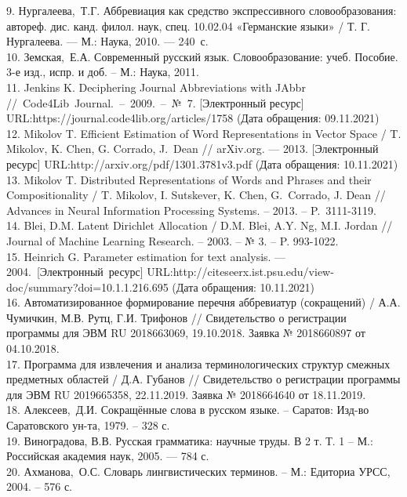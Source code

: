 \documentclass[a4paper, 12pt]{article}
\begin{document}
9. Нургалеева, Т.Г. Аббревиация как средство экспрессивного словообразования: автореф. дис. канд. филол. наук, спец. 10.02.04 «Германские языки» / Т. Г. Нургалеева. — М.: Наука, 2010. — 240 с.\\
10. Земская, Е.А. Современный русский язык. Словообразование: учеб. Пособие. 3-е изд., испр. и доб. – М.: Наука, 2011.\\
11. Jenkins K. Deciphering Journal Abbreviations with JAbbr // Code4Lib Journal. – 2009. – № 7. [Электронный ресурс] URL:https://journal.code4lib.org/articles/1758 (Дата обращения: 09.11.2021)\\
12. Mikolov T. Efficient Estimation of Word Representations in Vector Space / T. Mikolov, K. Chen, G. Corrado, J. Dean // arXiv.org. — 2013. [Электронный ресурс] URL:http://arxiv.org/pdf/1301.3781v3.pdf (Дата обращения: 10.11.2021)\\
13. Mikolov T. Distributed Representations of Words and Phrases and their Compositionality / T. Mikolov, I. Sutskever, K. Chen, G. Corrado, J. Dean // Advances in Neural Information Processing Systems. – 2013. – P. 3111-3119.\\
14. Blei, D.M. Latent Dirichlet Allocation / D.M. Blei, A.Y. Ng, M.I. Jordan // Journal of Machine Learning Research. – 2003. – № 3. – P. 993-1022.\\
15. Heinrich G. Parameter estimation for text analysis. — 2004. [Электронный ресурс] URL:http://citeseerx.ist.psu.edu/view-doc/summary?doi=10.1.1.216.695 (Дата обращения: 10.11.2021)\\
16. Автоматизированное формирование перечня аббревиатур (сокращений) / А.А. Чумичкин, М.В. Рутц, Г.И. Трифонов // Свидетельство о регистрации программы для ЭВМ RU 2018663069, 19.10.2018. Заявка № 2018660897 от 04.10.2018.\\
17. Программа для извлечения и анализа терминологических структур смежных предметных областей / Д.А. Губанов // Свидетельство о регистрации программы для ЭВМ RU 2019665358, 22.11.2019. Заявка № 2018664640 от 18.11.2019.\\
18. Алексеев, Д.И. Сокращённые слова в русском языке. – Саратов: Изд-во Саратовского ун-та, 1979. – 328 с.\\
19. Виноградова, В.В. Русская грамматика: научные труды. В 2 т. Т. 1 – М.: Российская академия наук, 2005. — 784 с.\\
20. Ахманова, О.С. Словарь лингвистических терминов. – М.: Едиториа УРСС, 2004. – 576 с.
\end{document}
